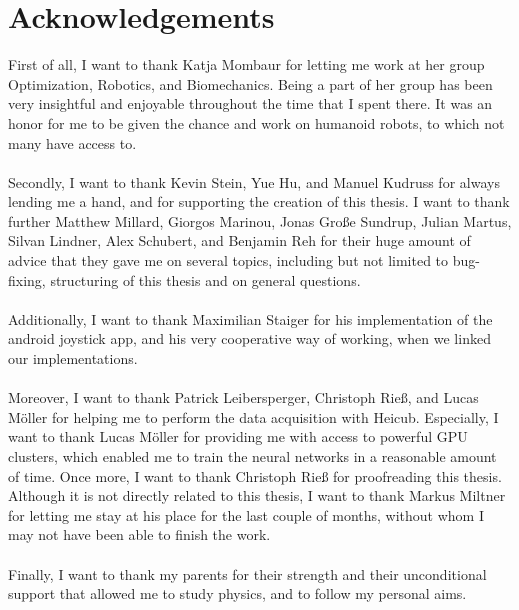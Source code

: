 \FloatBarrier
\chapter{Acknowledgements}
First of all, I want to thank Katja Mombaur for letting me work at her group Optimization, Robotics, and Biomechanics. Being a part of her group has been very insightful and enjoyable throughout the time that I spent there. It was an honor for me to be given the chance and work on humanoid robots, to which not many have access to.\\\\
Secondly, I want to thank Kevin Stein, Yue Hu, and Manuel Kudruss for always lending me a hand, and for supporting the creation of this thesis. I want to thank further Matthew Millard, Giorgos Marinou, Jonas Große Sundrup, Julian Martus, Silvan Lindner, Alex Schubert, and Benjamin Reh for their huge amount of advice that they gave me on several topics, including but not limited to bug-fixing, structuring of this thesis and on general questions. \\\\Additionally, I want to thank Maximilian Staiger for his implementation of the android joystick app, and his very cooperative way of working, when we linked our implementations.\\\\ Moreover, I want to thank Patrick Leibersperger, Christoph Rieß, and Lucas Möller for helping me to perform the data acquisition with Heicub. Especially, I want to thank Lucas Möller for providing me with access to powerful GPU clusters, which enabled me to train the neural networks in a reasonable amount of time. Once more, I want to thank Christoph Rieß for proofreading this thesis. Although it is not directly related to this thesis, I want to thank Markus Miltner for letting me stay at his place for the last couple of months, without whom I may not have been able to finish the work.\\\\
Finally, I want to thank my parents for their strength and their unconditional support that allowed me to study physics, and to follow my personal aims.